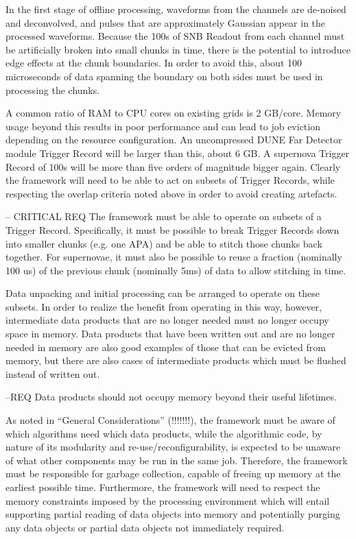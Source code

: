 \documentclass[../main-v1.tex]{subfiles}
\begin{document}
In the first stage of offline processing, waveforms from the channels are de-noised and deconvolved, and pulses that are approximately Gaussian appear in the processed waveforms. Because the 100s of SNB Readout from each channel must be artificially broken into small chunks in time, there is the potential to introduce edge effects at the chunk boundaries. In order to avoid this, about 100 microseconds of data spanning the boundary on both sides must be used in processing the chunks.

A common ratio of RAM to CPU cores on existing grids is 2 GB/core.  Memory usage beyond this results in poor performance and can lead to job eviction depending on the resource configuration.  An uncompressed DUNE Far Detector module Trigger Record will be larger than this, about 6 GB.  A supernova Trigger Record of 100s will be more than five orders of magnitude bigger again.  Clearly the framework will need to be able to act on subsets of Trigger Records, while respecting the overlap criteria noted above in order to avoid creating artefacts.

-- CRITICAL REQ The framework must be able to operate on subsets of a Trigger Record.  Specifically, it must be possible to break Trigger Records down into smaller chunks (e.g. one APA) and be able to stitch those chunks back together.  For supernovae, it must also be possible to reuse a fraction (nominally 100 us) of the previous chunk (nominally 5ms) of data to allow stitching in time.

Data unpacking and initial processing can be arranged to operate on these subsets.  In order to realize the benefit from operating in this way, however, intermediate data products that are no longer needed must no longer occupy space in memory.  Data products that have been written out and are no longer needed in memory are also good examples of those that can be evicted from memory, but there are also cases of intermediate products which must be flushed instead of written out.

--REQ Data products should not occupy memory beyond their useful lifetimes.

As noted in “General Considerations” (!!!!!!!), the framework must be aware of which algorithms need which data products, while the algorithmic code, by nature of its modularity and re-use/reconfigurability, is expected to be unaware of what other components may be run in the same job.  Therefore, the framework must be responsible for garbage collection, capable of freeing up memory at the earliest possible time.  Furthermore, the framework will need to respect the memory constraints imposed by the processing environment which will entail supporting partial reading of data objects into memory and potentially purging any data objects or partial data objects not immediately required.
\end{document}
